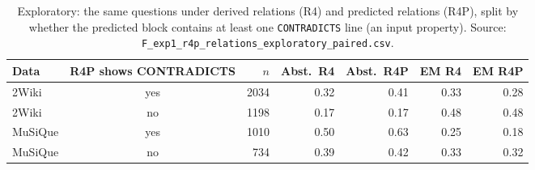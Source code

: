 \begin{table}[t]
\centering
\footnotesize
\begin{tabular}{@{}lcrrrrr@{}}
\toprule
Data & R4P shows CONTRADICTS & $n$ & Abst.\ R4 & Abst.\ R4P & EM R4 & EM R4P \\
\midrule
2Wiki & yes & 2034 & 0.32 & 0.41 & 0.33 & 0.28 \\
2Wiki & no & 1198 & 0.17 & 0.17 & 0.48 & 0.48 \\
MuSiQue & yes & 1010 & 0.50 & 0.63 & 0.25 & 0.18 \\
MuSiQue & no & 734 & 0.39 & 0.42 & 0.33 & 0.32 \\
\bottomrule
\end{tabular}
\caption{Exploratory: the same questions under derived relations (R4) and predicted relations (R4P), split by whether the predicted block contains at least one \texttt{CONTRADICTS} line (an input property). Source: \texttt{F\_exp1\_r4p\_relations\_exploratory\_paired.csv}.}
\label{tab:r4p}
\end{table}
